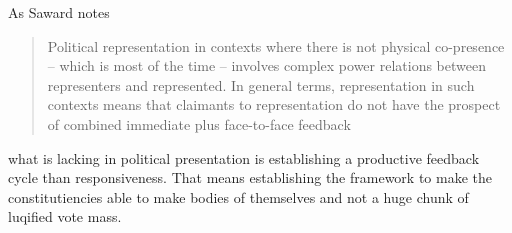 As Saward notes

\begin{quote}
	Political representation in contexts where there is not physical co-presence – which is most of the time – involves complex power relations between representers and represented. In general terms, representation in such contexts means that claimants to representation do not have the prospect of combined immediate plus face-to-face feedback
\end{quote}

what is lacking in political presentation is establishing a productive feedback
cycle than responsiveness. That means establishing the framework to make the
constitutiencies able to make bodies   of themselves and not a huge chunk of luqified vote mass.

\printbibliography


































